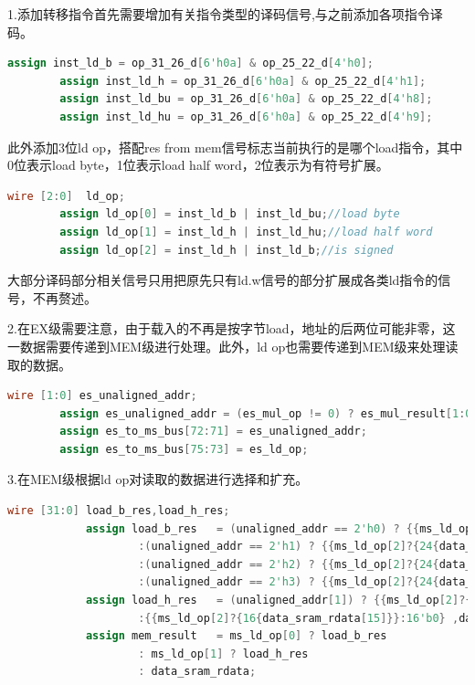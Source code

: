 \documentclass[12pt,a4paper]{article}
\begin{document}
        \par
        1.添加转移指令首先需要增加有关指令类型的译码信号,与之前添加各项指令译码。
        \begin{lstlisting}[language=Verilog]
        assign inst_ld_b = op_31_26_d[6'h0a] & op_25_22_d[4'h0];
        assign inst_ld_h = op_31_26_d[6'h0a] & op_25_22_d[4'h1];
        assign inst_ld_bu = op_31_26_d[6'h0a] & op_25_22_d[4'h8];
        assign inst_ld_hu = op_31_26_d[6'h0a] & op_25_22_d[4'h9]; 
        \end{lstlisting}
        此外添加3位ld op，搭配res from mem信号标志当前执行的是哪个load指令，其中0位表示load byte，1位表示load half word，2位表示为有符号扩展。
        \begin{lstlisting}[language=Verilog]
        wire [2:0]  ld_op;
        assign ld_op[0] = inst_ld_b | inst_ld_bu;//load byte
        assign ld_op[1] = inst_ld_h | inst_ld_hu;//load half word
        assign ld_op[2] = inst_ld_h | inst_ld_b;//is signed 
        \end{lstlisting}
        大部分译码部分相关信号只用把原先只有ld.w信号的部分扩展成各类ld指令的信号，不再赘述。
        \par
        2.在EX级需要注意，由于载入的不再是按字节load，地址的后两位可能非零，这一数据需要传递到MEM级进行处理。此外，ld op也需要传递到MEM级来处理读取的数据。
        \begin{lstlisting}[language=Verilog]
        wire [1:0] es_unaligned_addr;
        assign es_unaligned_addr = (es_mul_op != 0) ? es_mul_result[1:0] : es_alu_result[1:0];
        assign es_to_ms_bus[72:71] = es_unaligned_addr;
        assign es_to_ms_bus[75:73] = es_ld_op; 
        \end{lstlisting}
        \par
        3.在MEM级根据ld op对读取的数据进行选择和扩充。
        \begin{lstlisting}[language=Verilog]
            wire [31:0] load_b_res,load_h_res;
            assign load_b_res   = (unaligned_addr == 2'h0) ? {{ms_ld_op[2]?{24{data_sram_rdata[7]}}:24'b0} ,data_sram_rdata[7:0]}
                    :(unaligned_addr == 2'h1) ? {{ms_ld_op[2]?{24{data_sram_rdata[15]}}:24'b0},data_sram_rdata[15:8]}
                    :(unaligned_addr == 2'h2) ? {{ms_ld_op[2]?{24{data_sram_rdata[23]}}:24'b0},data_sram_rdata[23:16]}
                    :(unaligned_addr == 2'h3) ? {{ms_ld_op[2]?{24{data_sram_rdata[31]}}:24'b0},data_sram_rdata[31:24]} : 32'b0;
            assign load_h_res   = (unaligned_addr[1]) ? {{ms_ld_op[2]?{16{data_sram_rdata[31]}}:16'b0} ,data_sram_rdata[31:16]}
                    :{{ms_ld_op[2]?{16{data_sram_rdata[15]}}:16'b0} ,data_sram_rdata[15:0]};
            assign mem_result   = ms_ld_op[0] ? load_b_res 
                    : ms_ld_op[1] ? load_h_res
                    : data_sram_rdata;
        \end{lstlisting}\par
\end{document}
